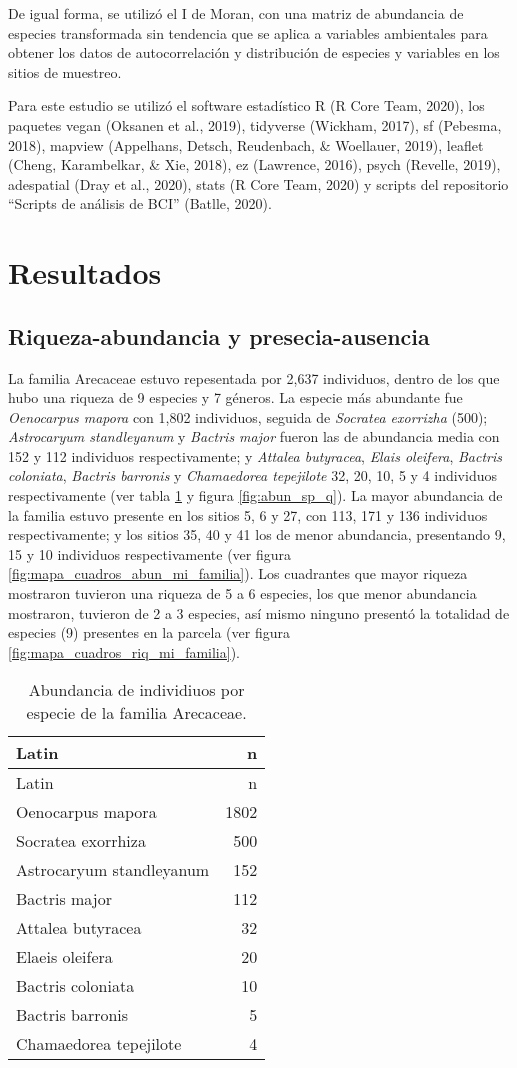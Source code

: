 \documentclass[11pt,]{article}
\begin{document}
De igual forma, se utilizó el I de Moran, con una matriz de abundancia
de especies transformada sin tendencia que se aplica a variables
ambientales para obtener los datos de autocorrelación y distribución de
especies y variables en los sitios de muestreo.

Para este estudio se utilizó el software estadístico R (R Core Team,
2020), los paquetes vegan (Oksanen et al., 2019), tidyverse (Wickham,
2017), sf (Pebesma, 2018), mapview (Appelhans, Detsch, Reudenbach, \&
Woellauer, 2019), leaflet (Cheng, Karambelkar, \& Xie, 2018), ez
(Lawrence, 2016), psych (Revelle, 2019), adespatial (Dray et al., 2020),
stats (R Core Team, 2020) y scripts del repositorio ``Scripts de
análisis de BCI'' (Batlle, 2020).

\section{Resultados}\label{resultados}

\subsection{Riqueza-abundancia y
presecia-ausencia}\label{riqueza-abundancia-y-presecia-ausencia}

La familia Arecaceae estuvo repesentada por 2,637 individuos, dentro de
los que hubo una riqueza de 9 especies y 7 géneros. La especie más
abundante fue \emph{Oenocarpus mapora} con 1,802 individuos, seguida de
\emph{Socratea exorrizha} (500); \emph{Astrocaryum standleyanum} y
\emph{Bactris major} fueron las de abundancia media con 152 y 112
individuos respectivamente; y \emph{Attalea butyracea}, \emph{Elais
oleifera}, \emph{Bactris coloniata}, \emph{Bactris barronis} y
\emph{Chamaedorea tepejilote} 32, 20, 10, 5 y 4 individuos
respectivamente (ver tabla \ref{tab:abun_sp} y figura
\ref{fig:abun_sp_q}). La mayor abundancia de la familia estuvo presente
en los sitios 5, 6 y 27, con 113, 171 y 136 individuos respectivamente;
y los sitios 35, 40 y 41 los de menor abundancia, presentando 9, 15 y 10
individuos respectivamente (ver figura
\ref{fig:mapa_cuadros_abun_mi_familia}). Los cuadrantes que mayor
riqueza mostraron tuvieron una riqueza de 5 a 6 especies, los que menor
abundancia mostraron, tuvieron de 2 a 3 especies, así mismo ninguno
presentó la totalidad de especies (9) presentes en la parcela (ver
figura \ref{fig:mapa_cuadros_riq_mi_familia}).

\begin{longtable}[]{@{}lr@{}}
\caption{\label{tab:abun_sp}Abundancia de individiuos por especie de la
familia Arecaceae.}\tabularnewline
\toprule
Latin & n\tabularnewline
\midrule
\endfirsthead
\toprule
Latin & n\tabularnewline
\midrule
\endhead
Oenocarpus mapora & 1802\tabularnewline
Socratea exorrhiza & 500\tabularnewline
Astrocaryum standleyanum & 152\tabularnewline
Bactris major & 112\tabularnewline
Attalea butyracea & 32\tabularnewline
Elaeis oleifera & 20\tabularnewline
Bactris coloniata & 10\tabularnewline
Bactris barronis & 5\tabularnewline
Chamaedorea tepejilote & 4\tabularnewline
\bottomrule
\end{longtable}
\end{document}
